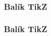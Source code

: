 \subsubsection{Balík TikZ}
\begin{frame}
	\frametitle{Balík TikZ}
	\UnderConstruction
\end{frame}

\endinput
